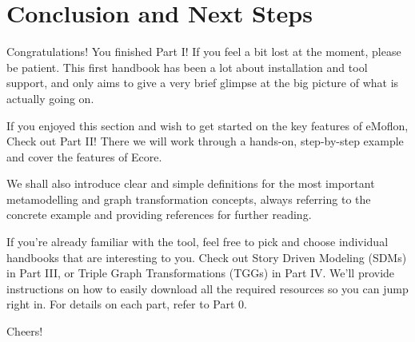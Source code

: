 \newpage
\genHeader

\vspace*{2cm}

\section{Conclusion and Next Steps}
\vspace{0.5cm}

Congratulations!\hypertarget{conclusion}{} You finished Part I! If you feel a bit lost at the moment, please be patient. This first handbook has been a lot about installation and tool support, and only aims to give a very brief glimpse at the big picture of what is actually going on.  

If you enjoyed this section and wish to get started on the key features of eMoflon, Check out Part II! There we will work through a hands-on, step-by-step example and cover the features of Ecore.

We shall also introduce clear and simple definitions for the most important metamodelling and graph transformation concepts, always referring to the concrete example and providing references for further reading.

If you're already familiar with the tool, feel free to pick and choose individual handbooks that are interesting to you. Check out Story Driven Modeling (SDMs) in Part III, or Triple Graph Transformations (TGGs) in Part IV. We'll provide instructions on how to easily download all the required resources so you can jump right in. For details on each part, refer to Part 0.

Cheers!